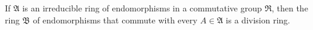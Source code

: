 If $\mathfrak{A}$ is an irreducible ring of endomorphisms in a commutative group $\mathfrak{R}$, then the ring $\mathfrak{B}$ of endomorphisms that commute with every $A \in \mathfrak{A}$ is a division ring.
